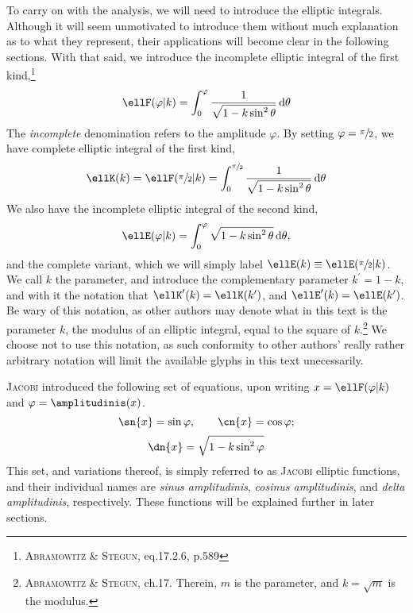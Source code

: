 To carry on with the analysis, we will need to introduce the elliptic integrals.
Although it will seem unmotivated to introduce them without much explanation as to what they represent, their applications will become clear in the following sections.
With that said, we introduce the incomplete elliptic integral of the first kind,\footnote{\cite{abramowitz1965handbook} \textsc{Abramowitz} \& \textsc{Stegun}, eq.17.2.6, p.589}
\begin{equation}\label{eq:incomplete_elliptic_integral_first}
  \ellF(\varphi \vert k) = \int_{0}^{\varphi} \frac{1}{\sqrt{1 - k \sin^2{\theta}}}\,\dee\theta
\end{equation}
The \emph{incomplete} denomination refers to the amplitude $\varphi$.
By setting $\varphi = \sfrac{\pi}{2}$, we have complete elliptic integral of the first kind,
\begin{equation}\label{eq:complete_elliptic_integral_first}
  \ellK(k) = \ellF(\sfrac{\pi}{2} \vert k) = \int_{0}^{\sfrac{\pi}{2}} \frac{1}{\sqrt{1 - k\sin^2{\theta}}} \,\dee\theta
\end{equation}
We also have the incomplete elliptic integral of the second kind,
\begin{equation}\label{eq:incomplete_elliptic_integral_second}
  \ellE(\varphi \vert k) = \int_{0}^{\varphi} \sqrt{1 - k \sin^2{\theta}}\,\dee\theta,
\end{equation}
and the complete variant, which we will simply label $\ellE(k) \equiv \ellE(\sfrac{\pi}{2} \vert k)$.
We call $k$ the parameter, and introduce the complementary parameter $k^{\prime} = 1 - k$, and with it the notation that $\ellK^{\prime}(k) = \ellK(k^{\prime})$, and $\ellE^{\prime}(k) = \ellE(k^{\prime})$.
Be wary of this notation, as other authors may denote what in this text is the parameter $k$, the modulus of an elliptic integral, equal to the square of $k$.\footnote{\cite{abramowitz1965handbook} \textsc{Abramowitz} \& \textsc{Stegun}, ch.17. Therein, $m$ is the parameter, and $k = \sqrt{m}$ is the modulus.}
We choose not to use this notation, as such conformity to other authors' really rather arbitrary notation will limit the available glyphs in this text unecessarily.

\textsc{Jacobi} introduced the following set of equations, upon writing $x = \ellF(\varphi \vert k)$ and $\varphi = \amplitudinis(x)$.
\begin{equation}\label{eq:jacobi_sn_cn}
  \sn{x} = \sin{\varphi}, \qquad \cn{x} = \cos{\varphi};
\end{equation}
\begin{equation}\label{eq:jacobi_dn}
  \dn{x} = \sqrt{1 - k\sin^2{\varphi}}
\end{equation}
This set, and variations thereof, is simply referred to as \textsc{Jacobi} elliptic functions, and their individual names are \emph{sinus amplitudinis}, \emph{cosinus amplitudinis}, and \emph{delta amplitudinis}, respectively.
These functions will be explained further in later sections.
